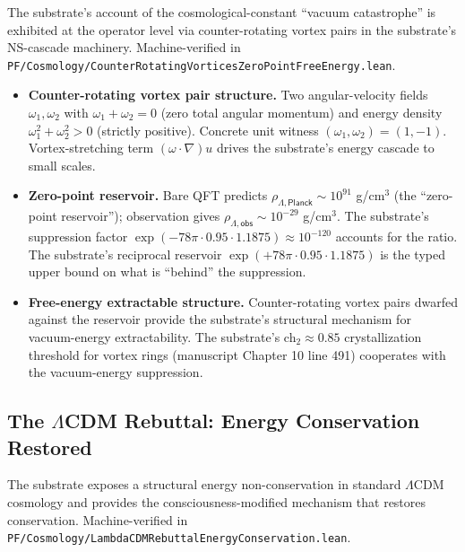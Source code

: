\documentclass[11pt,a4paper]{amsart}
\theoremstyle{plain}
\theoremstyle{definition}
\begin{document}
The substrate's account of the cosmological-constant ``vacuum catastrophe'' is exhibited at the operator level via counter-rotating vortex pairs in the substrate's NS-cascade machinery. Machine-verified in \texttt{PF/Cosmology/CounterRotatingVorticesZeroPointFreeEnergy.lean}.

\begin{itemize}[itemsep=2pt,leftmargin=2em]
\item \textbf{Counter-rotating vortex pair structure.} Two angular-velocity fields $\omega_1, \omega_2$ with $\omega_1 + \omega_2 = 0$ (zero total angular momentum) and energy density $\omega_1^2 + \omega_2^2 > 0$ (strictly positive). Concrete unit witness $(\omega_1, \omega_2) = (1, -1)$. Vortex-stretching term $(\omega \cdot \nabla) u$ drives the substrate's energy cascade to small scales.
\item \textbf{Zero-point reservoir.} Bare QFT predicts $\rho_{\Lambda, \textsf{Planck}} \sim 10^{91}$ g/cm${}^3$ (the ``zero-point reservoir''); observation gives $\rho_{\Lambda, \textsf{obs}} \sim 10^{-29}$ g/cm${}^3$. The substrate's suppression factor $\exp(-78\pi \cdot 0.95 \cdot 1.1875) \approx 10^{-120}$ accounts for the ratio. The substrate's reciprocal reservoir $\exp(+78\pi \cdot 0.95 \cdot 1.1875)$ is the typed upper bound on what is ``behind'' the suppression.
\item \textbf{Free-energy extractable structure.} Counter-rotating vortex pairs dwarfed against the reservoir provide the substrate's structural mechanism for vacuum-energy extractability. The substrate's ch${}_2 \approx 0.85$ crystallization threshold for vortex rings (manuscript Chapter 10 line 491) cooperates with the vacuum-energy suppression.
\end{itemize}

\subsection{The \texorpdfstring{$\Lambda$}{Lambda}CDM Rebuttal: Energy Conservation Restored}\label{subsec:lambdacdm-rebuttal}

The substrate exposes a structural energy non-conservation in standard $\Lambda$CDM cosmology and provides the consciousness-modified mechanism that restores conservation. Machine-verified in \texttt{PF/Cosmology/LambdaCDMRebuttalEnergyConservation.lean}.
\end{document}

